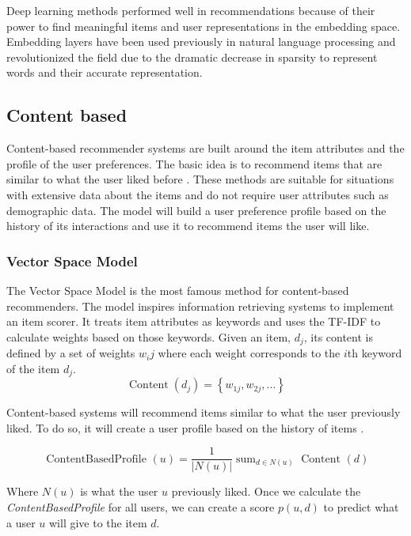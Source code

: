 \documentclass{kththesis}
\begin{document}
Deep learning methods performed well in recommendations because of their power to find meaningful items and user representations in the embedding space. Embedding layers have been used previously in natural language processing and revolutionized the field due to the dramatic decrease in sparsity to represent words and their accurate representation. 

\subsection{Content based}
Content-based recommender systems are built around the item attributes and the profile of the user preferences. The basic idea is to recommend items that are similar to what the user liked before \cite{contentbased}. These methods are suitable for situations with extensive data about the items and do not require user attributes such as demographic data. The model will build a user preference profile based on the history of its interactions and use it to recommend items the user will like.

\subsubsection{Vector Space Model}
The Vector Space Model \cite{vectorspacemodel} is the most famous method for content-based recommenders. The model inspires information retrieving systems to implement an item scorer. It treats item attributes as keywords and uses the TF-IDF \cite{tfidf} to calculate weights based on those keywords. Given an item, $d_j$, its content is defined by a set of weights $w_ij$ where each weight corresponds to the $i$th keyword of the item $d_j$.
\begin{equation}
\operatorname{Content}\left(d_{j}\right)=\left\{w_{1 j}, w_{2 j}, \ldots\right\}
\end{equation}

Content-based systems will recommend items similar to what the user previously liked. To do so, it will create a user profile based on the history of items \cite{contentprofile}.

\begin{equation}
\text { ContentBasedProfile }(u)=\frac{1}{|N(u)|} \operatorname{sum}_{d \in N(u)} \text { Content }(d)
\end{equation}

Where $N(u)$ is what the user $u$ previously liked. Once we calculate the \textit{ContentBasedProfile} for all users, we can create a score $p(u,d)$ to predict what a user $u$ will give to the item $d$.
\end{document}
